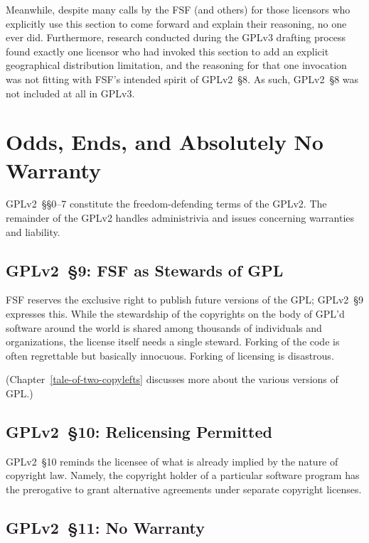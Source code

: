 Meanwhile, despite many calls by the FSF (and others) for those licensors who
explicitly use this section to come forward and explain their reasoning, no
one ever did.  Furthermore, research conducted during the GPLv3 drafting
process found exactly one licensor who had invoked this section to add an
explicit geographical distribution limitation, and the reasoning for that one
invocation was not fitting with FSF's intended spirit of GPLv2~\S8.  As such,
GPLv2~\S8 was not included at all in GPLv3.

\chapter{Odds, Ends, and Absolutely No Warranty}

GPLv2~\S\S0--7 constitute the freedom-defending terms of the GPLv2.  The remainder
of the GPLv2 handles administrivia and issues concerning warranties and
liability.

\section{GPLv2~\S9: FSF as Stewards of GPL}
\label{GPLv2s9}

FSF reserves the exclusive right to publish future versions of the GPL\@;
GPLv2~\S9 expresses this.  While the stewardship of the copyrights on the body
of GPL'd software around the world is shared among thousands of
individuals and organizations, the license itself needs a single steward.
Forking of the code is often regrettable but basically innocuous.  Forking
of licensing is disastrous.

(Chapter~\ref{tale-of-two-copylefts} discusses more about the various
versions of GPL.)

\section{GPLv2~\S10: Relicensing Permitted}
\label{GPLv2s10}

GPLv2~\S10 reminds the licensee of what is already implied by the nature of
copyright law.  Namely, the copyright holder of a particular software
program has the prerogative to grant alternative agreements under separate
copyright licenses.

\section{GPLv2~\S11: No Warranty}
\label{GPLv2s11}

